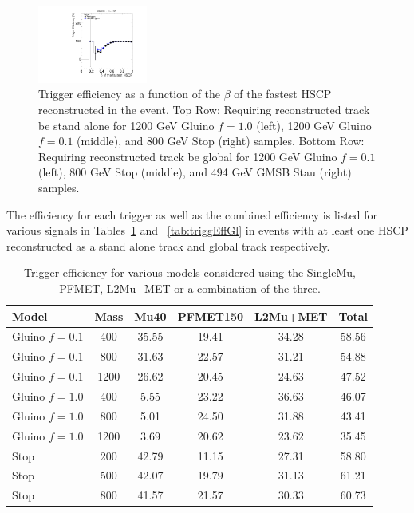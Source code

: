 \begin{figure}
  \includegraphics[clip=true, trim=0.0cm 0cm 3.0cm 0cm, width=0.32\textwidth]{figures/search/GMStau_8TeV_M494MatchedGl}
\caption{Trigger efficiency as a function of the $\beta$ of the fastest HSCP reconstructed in the event.
Top Row: Requiring reconstructed track be stand alone for 1200 GeV Gluino $f=1.0$ (left), 1200 GeV Gluino $f=0.1$ (middle), and 800 GeV Stop (right) samples.
Bottom Row: Requiring reconstructed track be global for 1200 GeV Gluino $f=0.1$ (left), 800 GeV Stop (middle), and 494 GeV GMSB Stau (right) samples.
    \label{fig:TriggerEffVsBetaGl}}
\end{figure}

The efficiency for each trigger as well as the combined efficiency is listed for various signals in Tables~\ref{tab:triggEffSA} and ~\ref{tab:triggEffGl} in events
with at least one HSCP reconstructed as a stand alone track and global track respectively.

\begin{table}
 \begin{center}
  \caption{Trigger efficiency for various models considered using the SingleMu, PFMET, L2Mu+MET or a combination of the three.
     \label{tab:triggEffSA}}
  \begin{tabular}{|l|c|c|c|c|c|} \hline
      Model     & Mass  & Mu40       & PFMET150   &  L2Mu+MET  & Total                 \\ \hline
 Gluino $f=0.1$ &  400  & 35.55      & 19.41      & 34.28      & 58.56    \\
 Gluino $f=0.1$ &  800  & 31.63      & 22.57      & 31.21      & 54.88    \\
 Gluino $f=0.1$ & 1200  & 26.62      & 20.45      & 24.63      & 47.52    \\
 Gluino $f=1.0$ &  400  &  5.55      & 23.22      & 36.63      & 46.07    \\
 Gluino $f=1.0$ &  800  &  5.01      & 24.50      & 31.88      & 43.41    \\
 Gluino $f=1.0$ & 1200  &  3.69      & 20.62      & 23.62      & 35.45    \\
           Stop &  200  & 42.79      & 11.15      & 27.31      & 58.80    \\
           Stop &  500  & 42.07      & 19.79      & 31.13      & 61.21    \\
           Stop &  800  & 41.57      & 21.57      & 30.33      & 60.73    \\ \hline
  \end{tabular}
 \end{center}
\end{table}

